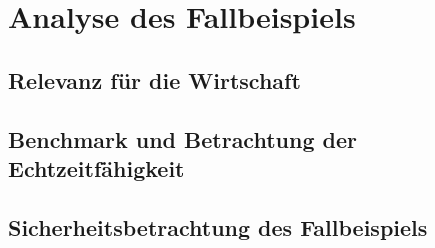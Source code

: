 \documentclass[
  a4paper,					    %
  twoside,
  DIV=calc,     				%
  bibliography=totoc,
  cleardoublepage=empty,
  ngerman,     					%
  final       					%
]{scrbook}
\begin{document}
\chapter{Analyse des Fallbeispiels}
\label{sec:Beispiel_Analyse}




\section{Relevanz für die Wirtschaft}
\label{sec:Wirtschaft}
% 



% 
\section{Benchmark und Betrachtung der Echtzeitfähigkeit}
\label{sec:Benchmark}
%
%






\section{Sicherheitsbetrachtung des Fallbeispiels}
\label{sec:Sicherheit_Beispiel}
\end{document}
